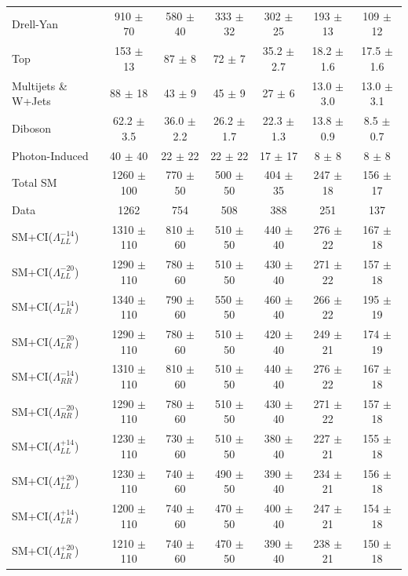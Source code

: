 \begin {table}[h]
\begin{center}
\begin{tabular}{  l | c c c | c c c  }
			\hline
			Drell-Yan & 910 $\pm$ 70 & 580 $\pm$ 40 & 333 $\pm$ 32 & 302 $\pm$ 25 & 193 $\pm$ 13 & 109 $\pm$ 12 \\
			Top & 153 $\pm$ 13 & 87 $\pm$ 8 & 72 $\pm$ 7 & 35.2 $\pm$ 2.7 & 18.2 $\pm$ 1.6 & 17.5 $\pm$ 1.6 \\
			Multijets \& W+Jets & 88 $\pm$ 18 & 43 $\pm$ 9 & 45 $\pm$ 9 & 27 $\pm$ 6 & 13.0 $\pm$ 3.0 & 13.0 $\pm$ 3.1 \\
			Diboson & 62.2 $\pm$ 3.5 & 36.0 $\pm$ 2.2 & 26.2 $\pm$ 1.7 & 22.3 $\pm$ 1.3 & 13.8 $\pm$ 0.9 & 8.5 $\pm$ 0.7 \\
			Photon-Induced & 40 $\pm$ 40 & 22 $\pm$ 22 & 22 $\pm$ 22 & 17 $\pm$ 17 & 8 $\pm$ 8 & 8 $\pm$ 8 \\
			\hline
			Total SM & 1260 $\pm$ 100 & 770 $\pm$ 50 & 500 $\pm$ 50 & 404 $\pm$ 35 & 247 $\pm$ 18 & 156 $\pm$ 17 \\
			\hline
			Data & 1262 & 754 & 508 & 388 & 251 & 137 \\
			\hline
			SM+CI($\Lambda^{-14}_{LL}$) & 1310 $\pm$ 110 & 810 $\pm$ 60 & 510 $\pm$ 50 & 440 $\pm$ 40 & 276 $\pm$ 22 & 167 $\pm$ 18 \\
			SM+CI($\Lambda^{-20}_{LL}$) & 1290 $\pm$ 110 & 780 $\pm$ 60 & 510 $\pm$ 50 & 430 $\pm$ 40 & 271 $\pm$ 22 & 157 $\pm$ 18 \\
			SM+CI($\Lambda^{-14}_{LR}$) & 1340 $\pm$ 110 & 790 $\pm$ 60 & 550 $\pm$ 50 & 460 $\pm$ 40 & 266 $\pm$ 22 & 195 $\pm$ 19 \\
			SM+CI($\Lambda^{-20}_{LR}$) & 1290 $\pm$ 110 & 780 $\pm$ 60 & 510 $\pm$ 50 & 420 $\pm$ 40 & 249 $\pm$ 21 & 174 $\pm$ 19 \\
			SM+CI($\Lambda^{-14}_{RR}$) & 1310 $\pm$ 110 & 810 $\pm$ 60 & 510 $\pm$ 50 & 440 $\pm$ 40 & 276 $\pm$ 22 & 167 $\pm$ 18 \\
			SM+CI($\Lambda^{-20}_{RR}$) & 1290 $\pm$ 110 & 780 $\pm$ 60 & 510 $\pm$ 50 & 430 $\pm$ 40 & 271 $\pm$ 22 & 157 $\pm$ 18 \\
			\hline
			SM+CI($\Lambda^{+14}_{LL}$) & 1230 $\pm$ 110 & 730 $\pm$ 60 & 510 $\pm$ 50 & 380 $\pm$ 40 & 227 $\pm$ 21 & 155 $\pm$ 18 \\
			SM+CI($\Lambda^{+20}_{LL}$) & 1230 $\pm$ 110 & 740 $\pm$ 60 & 490 $\pm$ 50 & 390 $\pm$ 40 & 234 $\pm$ 21 & 156 $\pm$ 18 \\
			SM+CI($\Lambda^{+14}_{LR}$) & 1200 $\pm$ 110 & 740 $\pm$ 60 & 470 $\pm$ 50 & 400 $\pm$ 40 & 247 $\pm$ 21 & 154 $\pm$ 18 \\
			SM+CI($\Lambda^{+20}_{LR}$) & 1210 $\pm$ 110 & 740 $\pm$ 60 & 470 $\pm$ 50 & 390 $\pm$ 40 & 238 $\pm$ 21 & 150 $\pm$ 18 \\

\end{tabular}
\end{center}
\end{table}
